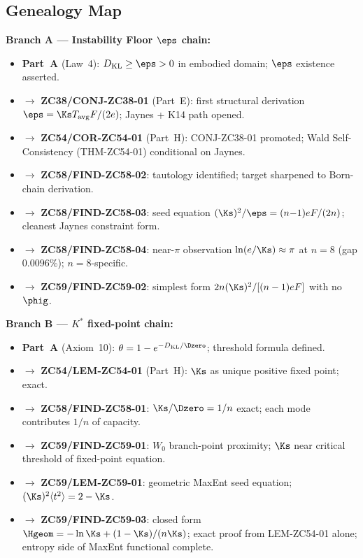 \documentclass[12pt, a4paper]{article}
\begin{document}
\subsection{Genealogy Map}
\label{sec:genealogy}

\begin{genealogybox}[title={How ZC59's Key Objects Trace Back
  through the Z-Programme}]
\textbf{Branch A --- Instability Floor $\eps$ chain:}
\begin{itemize}[leftmargin=2em, noitemsep]
\item \textbf{Part~A} (Law~4): $D_{\rm KL} \geq \eps > 0$
  in embodied domain; $\eps$ existence asserted.
\item $\to$ \textbf{ZC38/CONJ-ZC38-01} (Part~E):
  first structural derivation $\eps = \Ks T_{\rm avg}F/(2e)$;
  Jaynes + K14 path opened.
\item $\to$ \textbf{ZC54/COR-ZC54-01} (Part~H):
  CONJ-ZC38-01 promoted; Wald Self-Consistency
  (THM-ZC54-01) conditional on Jaynes.
\item $\to$ \textbf{ZC58/FIND-ZC58-02}: tautology identified;
  target sharpened to Born-chain derivation.
\item $\to$ \textbf{ZC58/FIND-ZC58-03}: seed equation
  $(\Ks)^2/\eps = (n{-}1)eF/(2n)$; cleanest Jaynes constraint form.
\item $\to$ \textbf{ZC58/FIND-ZC58-04}: near-$\pi$ observation
  $\ln(e/\Ks)\approx\pi$ at $n=8$ (gap $0.0096\%$); $n=8$-specific.
\item $\to$ \textbf{ZC59/FIND-ZC59-02}: simplest form
  $2n(\Ks)^2/[(n-1)eF]$ with no $\phig$.
\end{itemize}

\textbf{Branch B --- $K^*$ fixed-point chain:}
\begin{itemize}[leftmargin=2em, noitemsep]
\item \textbf{Part~A} (Axiom~10):
  $\theta = 1-e^{-D_{\rm KL}/\Dzero}$; threshold formula defined.
\item $\to$ \textbf{ZC54/LEM-ZC54-01} (Part~H):
  $\Ks$ as unique positive fixed point; exact.
\item $\to$ \textbf{ZC58/FIND-ZC58-01}: $\Ks/\Dzero = 1/n$ exact;
  each mode contributes $1/n$ of capacity.
\item $\to$ \textbf{ZC59/FIND-ZC59-01}: $W_0$ branch-point
  proximity; $\Ks$ near critical threshold of fixed-point equation.
\item $\to$ \textbf{ZC59/LEM-ZC59-01}: geometric MaxEnt seed
  equation; $(\Ks)^2\langle t^2\rangle = 2-\Ks$.
\item $\to$ \textbf{ZC59/FIND-ZC59-03}: closed form
  $\Hgeom = -\ln\Ks + (1-\Ks)/(n\Ks)$; exact proof from
  LEM-ZC54-01 alone; entropy side of MaxEnt functional complete.
\end{itemize}


\end{genealogybox}
\end{document}
